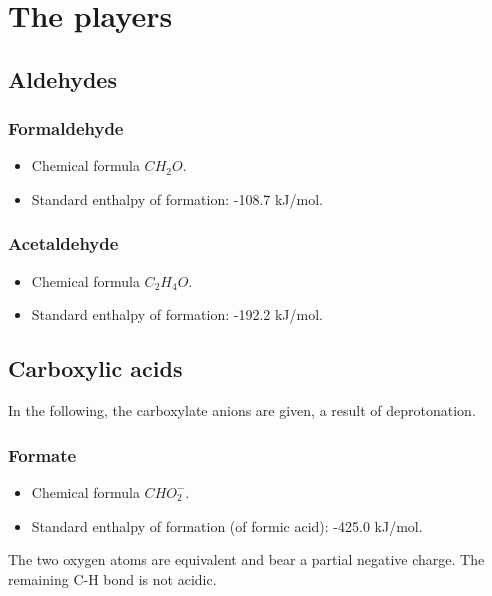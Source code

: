 \documentclass{article}
\begin{document}

\section{The players}\label{sec_players}

\subsection{Aldehydes}

\subsubsection{Formaldehyde}

\begin{itemize}
    \item Chemical formula $CH_2O$.
    \item Standard enthalpy of formation: -108.7 kJ/mol.
\end{itemize}

\subsubsection{Acetaldehyde}

\begin{itemize}
    \item Chemical formula $C_2H_4O$.
    \item Standard enthalpy of formation: -192.2 kJ/mol.
\end{itemize}

\subsection{Carboxylic acids}

In the following, the carboxylate anions are given, a result of deprotonation.

\subsubsection{Formate}
\begin{itemize}
    \item Chemical formula $CHO_2^-$.
    \item Standard enthalpy of formation (of formic acid): -425.0 kJ/mol.
\end{itemize}
The two oxygen atoms are equivalent and bear a partial negative charge. The remaining C-H
bond is not acidic.
\end{document}
